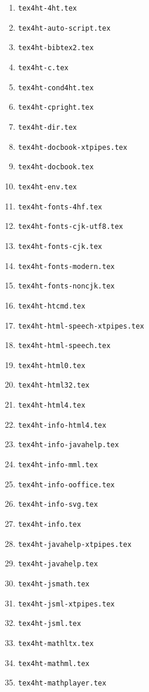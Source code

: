 \begin{enumerate}
\item \Verb=tex4ht-4ht.tex=
\item \Verb=tex4ht-auto-script.tex=
\item \Verb=tex4ht-bibtex2.tex=
\item \Verb=tex4ht-c.tex=
\item \Verb=tex4ht-cond4ht.tex=
\item \Verb=tex4ht-cpright.tex=
\item \Verb=tex4ht-dir.tex=
\item \Verb=tex4ht-docbook-xtpipes.tex=
\item \Verb=tex4ht-docbook.tex=
\item \Verb=tex4ht-env.tex=
\item \Verb=tex4ht-fonts-4hf.tex=
\item \Verb=tex4ht-fonts-cjk-utf8.tex=
\item \Verb=tex4ht-fonts-cjk.tex=
\item \Verb=tex4ht-fonts-modern.tex=
\item \Verb=tex4ht-fonts-noncjk.tex=
\item \Verb=tex4ht-htcmd.tex=
\item \Verb=tex4ht-html-speech-xtpipes.tex=
\item \Verb=tex4ht-html-speech.tex=
\item \Verb=tex4ht-html0.tex=
\item \Verb=tex4ht-html32.tex=
\item \Verb=tex4ht-html4.tex=
\item \Verb=tex4ht-info-html4.tex=
\item \Verb=tex4ht-info-javahelp.tex=
\item \Verb=tex4ht-info-mml.tex=
\item \Verb=tex4ht-info-ooffice.tex=
\item \Verb=tex4ht-info-svg.tex=
\item \Verb=tex4ht-info.tex=
\item \Verb=tex4ht-javahelp-xtpipes.tex=
\item \Verb=tex4ht-javahelp.tex=
\item \Verb=tex4ht-jsmath.tex=
\item \Verb=tex4ht-jsml-xtpipes.tex=
\item \Verb=tex4ht-jsml.tex=
\item \Verb=tex4ht-mathltx.tex=
\item \Verb=tex4ht-mathml.tex=
\item \Verb=tex4ht-mathplayer.tex=

\end{enumerate}
